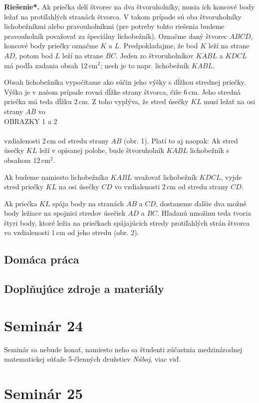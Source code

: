 \documentclass[11pt,a4paper,oneside,final]{book}
\newcommand{\rieh}{\textbf{Riešenie*.} }
\begin{document}
\rieh Ak priečka delí štvorec na dva štvoruholníky, musia ich koncové body ležať na protiľahlých stranách štvorca. V takom prípade sú oba štvoruholníky lichobežníkmi alebo pravouholníkmi (pre potreby tohto riešenia budeme pravouholník považovať za špeciálny lichobežník). Označme daný štvorec $ABCD$, koncové body priečky označme $K$ a $L$. Predpokladajme, že bod $K$ leží na strane $AD$, potom bod $L$ leží na strane $BC$. Jeden zo štvoruholníkov $KABL$ a $KDCL$ má podľa zadania obsah 12\,cm$^2$; nech je to napr. lichobežník $KABL$.

Obsah lichobežníka vypočítame ako súčin jeho výšky s dĺžkou strednej priečky. Výška je v našom prípade rovná dĺžke strany štvorca, čiže 6\,cm. Jeho stredná priečka má teda dĺžku 2\,cm. Z toho vyplýva, že stred úsečky $KL$ musí ležať na osi strany $AB$ vo
\\
OBRAZKY 1 a 2\\
\\
vzdialenosti 2\,cm od stredu strany $AB$ (obr. 1). Platí to aj naopak: Ak stred úsečky $KL$ leží v opísanej polohe, bude štvoruholník $KABL$ lichobežník s obsahom 12\,cm$^2$.

Ak budeme namiesto lichobežníka $KABL$ uvažovať lichobežník $KDCL$, vyjde stred priečky $KL$ na osi úsečky $CD$ vo vzdialenosti 2\,cm od stredu strany $CD$.

Ak priečka $KL$ spája body na stranách $AB$ a $CD$, dostaneme ďalšie dva možné body ležiace na spojnici stredov úsečiek $AD$ a $BC$. Hľadanú množinu teda tvoria štyri body, ktoré ležia na priečkach spájajúcich stredy protiľahlých strán štvorca vo vzdialenosti 1\,cm od jeho stredu (obr. 2).
\subsection*{Domáca práca}

\subsection*{Doplňujúce zdroje a materiály}


\newpage
\section*{Seminár 24}
Seminár sa nebude konať, namiesto neho sa študenti zúčastnia medzinárodnej matematickej súťaže 5-členných družstiev \textit{Náboj}, viac viď.
\newpage
\section*{Seminár 25}
\end{document}
